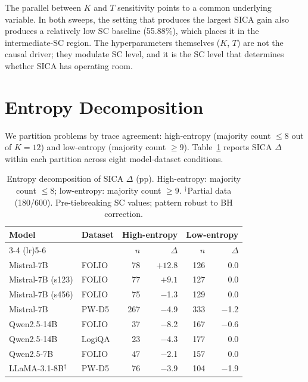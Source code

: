 The parallel between $K$ and $T$ sensitivity points to a common underlying variable. In both sweeps, the setting that produces the largest SICA gain also produces a relatively low SC baseline (55.88\%), which places it in the intermediate-SC region. The hyperparameters themselves ($K$, $T$) are not the causal driver; they modulate SC level, and it is the SC level that determines whether SICA has operating room.


\section{Entropy Decomposition}
\label{app:entropy}
\label{sec:entropy}

We partition problems by trace agreement: high-entropy (majority count $\leq 8$ out of $K = 12$) and low-entropy (majority count $\geq 9$). Table~\ref{tab:entropy} reports SICA $\Delta$ within each partition across eight model-dataset conditions.

\begin{table}[h]
\centering
\small
\caption{Entropy decomposition of SICA $\Delta$ (pp). High-entropy: majority count $\leq 8$; low-entropy: majority count $\geq 9$. $^\dagger$Partial data (180/600). Pre-tiebreaking SC values; pattern robust to BH correction.}
\label{tab:entropy}
\setlength{\tabcolsep}{3.5pt}
\begin{tabular}{@{}llrrrr@{}}
\toprule
Model & Dataset & \multicolumn{2}{c}{High-entropy} & \multicolumn{2}{c}{Low-entropy} \\
\cmidrule(lr){3-4} \cmidrule(lr){5-6}
 & & $n$ & $\Delta$ & $n$ & $\Delta$ \\
\midrule
Mistral-7B & FOLIO & 78 & $\mathbf{+12.8}$ & 126 & 0.0 \\
Mistral-7B (s123) & FOLIO & 77 & $\mathbf{+9.1}$ & 127 & 0.0 \\
Mistral-7B (s456) & FOLIO & 75 & $-$1.3 & 129 & 0.0 \\
Mistral-7B & PW-D5 & 267 & $-$4.9 & 333 & $-$1.2 \\
Qwen2.5-14B & FOLIO & 37 & $-$8.2 & 167 & $-$0.6 \\
Qwen2.5-14B & LogiQA & 23 & $-$4.3 & 177 & 0.0 \\
Qwen2.5-7B & FOLIO & 47 & $-$2.1 & 157 & 0.0 \\
LLaMA-3.1-8B$^\dagger$ & PW-D5 & 76 & $-$3.9 & 104 & $-$1.9 \\
\bottomrule
\end{tabular}
\end{table}

